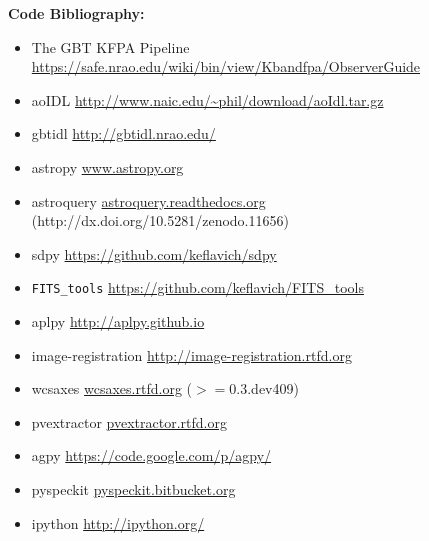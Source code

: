 \textbf{Code Bibliography:} 
\begin{itemize}
    \item The GBT KFPA Pipeline \url{https://safe.nrao.edu/wiki/bin/view/Kbandfpa/ObserverGuide}
    \item aoIDL \url{http://www.naic.edu/~phil/download/aoIdl.tar.gz}
    \item gbtidl \url{http://gbtidl.nrao.edu/}
    \item astropy \url{www.astropy.org} \citep{Astropy-Collaboration2013a}
    \item astroquery \url{astroquery.readthedocs.org} (http://dx.doi.org/10.5281/zenodo.11656)
    \item sdpy \url{https://github.com/keflavich/sdpy}
    \item \texttt{FITS\_tools} \url{https://github.com/keflavich/FITS_tools}
    \item aplpy \url{http://aplpy.github.io}
    \item image-registration \url{http://image-registration.rtfd.org}
    \item wcsaxes \url{wcsaxes.rtfd.org} ($>=$0.3.dev409)
    \item pvextractor \url{pvextractor.rtfd.org}
    \item agpy \url{https://code.google.com/p/agpy/}
    \item pyspeckit \url{pyspeckit.bitbucket.org} \citep{Ginsburg2011c}
    \item ipython \url{http://ipython.org/} \citep{Perez2007a}
\end{itemize}

%
%

